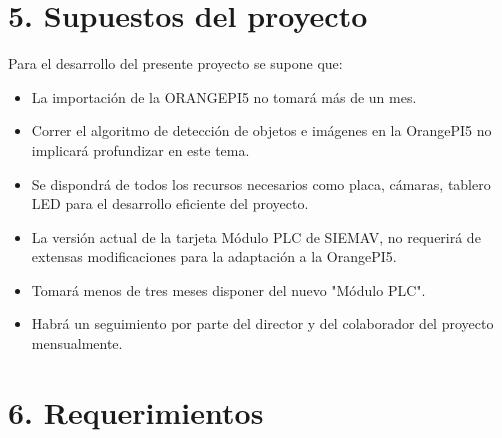 \documentclass[
11pt, %
]{charter}
\begin{document}
\section{5. Supuestos del proyecto}
\label{sec:supuestos}


Para el desarrollo del presente proyecto se supone que:

\begin{itemize}
	\item La importación de la ORANGEPI5 no tomará más de un mes.
	\item Correr el algoritmo de detección de objetos e imágenes en la OrangePI5 no implicará profundizar en este tema.
	\item Se dispondrá de todos los recursos necesarios como placa, cámaras, tablero LED para el desarrollo eficiente del proyecto.
	\item La versión actual de la tarjeta Módulo PLC de SIEMAV, no requerirá de extensas modificaciones para la adaptación a la OrangePI5.
	\item Tomará menos de tres meses disponer del nuevo "Módulo PLC".
	\item Habrá un seguimiento por parte del director y del colaborador del proyecto mensualmente.
\end{itemize}


\section{6. Requerimientos}
\label{sec:requerimientos}
\end{document}
